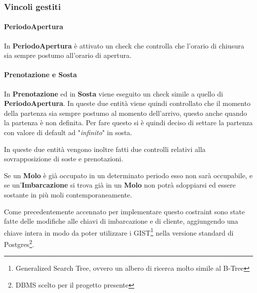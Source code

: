 \subsubsection{Vincoli gestiti}

\paragraph{PeriodoApertura}
In \textbf{PeriodoApertura} è attivato un check che controlla che l'orario di chiusura sia sempre postumo all'orario di apertura.

\paragraph{Prenotazione e Sosta}
In \textbf{Prenotazione} ed in \textbf{Sosta} viene eseguito un check simile a quello di \textbf{PeriodoApertura}. In queste due entità viene quindi controllato che il momento della partenza sia sempre postumo al momento dell'arrivo, questo anche quando la partenza è non definita. Per fare questo si è quindi deciso di settare la partenza con valore di default ad "\textit{infinito}" in sosta.

In queste due entità vengono inoltre fatti due controlli relativi alla sovrapposizione di soste e prenotazioni.

Se un \textbf{Molo} è già occupato in un determinato periodo esso non sarà occupabile, e se un'\textbf{Imbarcazione} si trova già in un \textbf{Molo} non potrà sdoppiarsi ed essere sostante in più moli contemporaneamente.

Come precedentemente accennato per implementare questo costraint sono state fatte delle modifiche alle chiavi di imbarcazione e di cliente, aggiungendo una chiave intera in modo da poter utilizzare i GIST\footnote{Generalized Search Tree, ovvero un albero di ricerca molto simile al B-Tree} nella versione standard di Postgres\footnote{DBMS scelto per il progetto presente}.

